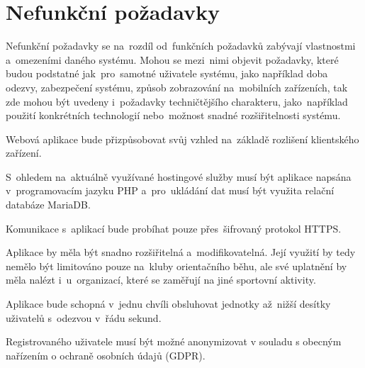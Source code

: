 \section{Nefunkční požadavky}
Nefunkční požadavky se na~rozdíl od~funkčních požadavků zabývají vlastnostmi a~omezeními daného systému. Mohou se mezi~nimi objevit požadavky, které budou podstatné jak~pro~samotné uživatele systému, jako například doba odezvy, zabezpečení systému, způsob zobrazování na~mobilních zařízeních, tak zde mohou být uvedeny i~požadavky techničtějšího charakteru, jako~například použití konkrétních technologií nebo~možnost snadné rozšiřitelnosti systému. \cite{requirements}

\begin{enumerate}[label=\textcolor{decoration}{\textbf{N\arabic*}}, leftmargin=7mm]
	Webová aplikace bude přizpůsobovat svůj vzhled na~základě rozlišení klientského zařízení.

	S~ohledem na~aktuálně využívané hostingové služby musí být aplikace napsána v~programovacím jazyku PHP a~pro~ukládání dat musí být využita relační databáze MariaDB.

	Komunikace s~aplikací bude probíhat pouze přes~šifrovaný protokol HTTPS.

	Aplikace by měla být snadno rozšiřitelná a~modifikovatelná. Její využití by tedy nemělo být limitováno pouze na~kluby orientačního běhu, ale své uplatnění by měla nalézt i~u~organizací, které se zaměřují na jiné sportovní aktivity.

	Aplikace bude schopná v~jednu chvíli obsluhovat jednotky až~nižší desítky uživatelů s~odezvou v~řádu sekund.

	Registrovaného uživatele musí být možné anonymizovat v souladu s obecným nařízením o ochraně osobních údajů (GDPR).
\end{enumerate}
